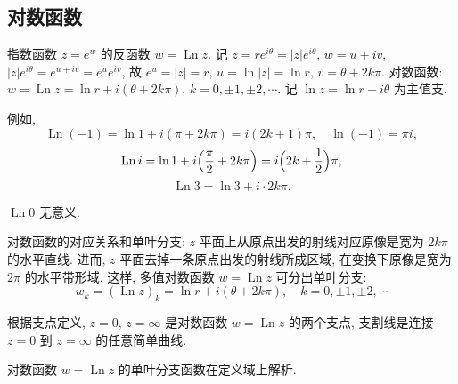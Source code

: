 \documentclass[theorem=false,mathfont=none,openany,sub3section]{easybook}
\begin{document}
\subsection{对数函数}

\begin{definition}
  指数函数 $z=e^{w}$ 的反函数 $w=\operatorname{Ln}z$.
  记 $z=re^{i\theta}=|z|e^{i\theta}$, $w=u+iv$, $|z|e^{i\theta}=e^{u+iv}=e^{u}e^{iv}$,
  故 $e^{u}=|z|=r$, $u=\ln|z|=\ln r$, $v=\theta+2k\pi$.
  对数函数: $w=\operatorname{Ln}z=\ln r+i(\theta+2k\pi)$, $k=0,\pm1,\pm2,\cdots$.
  记 $\ln z=\ln r+i\theta$ 为主值支.
\end{definition}

例如,
\[
\operatorname{Ln}(-1)=\ln1+i(\pi+2k\pi)=i(2k+1)\pi,\quad
\ln(-1)=\pi i,
\]
\[
\operatorname{Ln}i=\ln1+i\Bigl(\frac{\pi}{2}+2k\pi\Bigr)=i\Bigl(2k+\frac{1}{2}\Bigr)\pi,
\]
\[
\operatorname{Ln}3=\ln3+i\cdot 2k\pi.
\]

$\operatorname{Ln}0$ 无意义.

对数函数的对应关系和单叶分支: $z$ 平面上从原点出发的射线对应原像是宽为 $2k\pi$ 的水平直线. 进而, $z$ 平面去掉一条原点出发的射线所成区域, 在变换下原像是宽为 $2\pi$ 的水平带形域. 这样, 多值对数函数 $w=\operatorname{Ln}z$ 可分出单叶分支:
\[
w_{k}=(\operatorname{Ln}z)_{k}=\ln r+i(\theta+2k\pi),\quad k=0,\pm1,\pm2,\cdots
\]

\begin{center}
\end{center}

根据支点定义, $z=0$, $z=\infty$ 是对数函数 $w=\operatorname{Ln}z$ 的两个支点, 支割线是连接 $z=0$ 到 $z=\infty$ 的任意简单曲线.

\begin{corollary}
  对数函数 $w=\operatorname{Ln}z$ 的单叶分支函数在定义域上解析.
\end{corollary}
\end{document}
